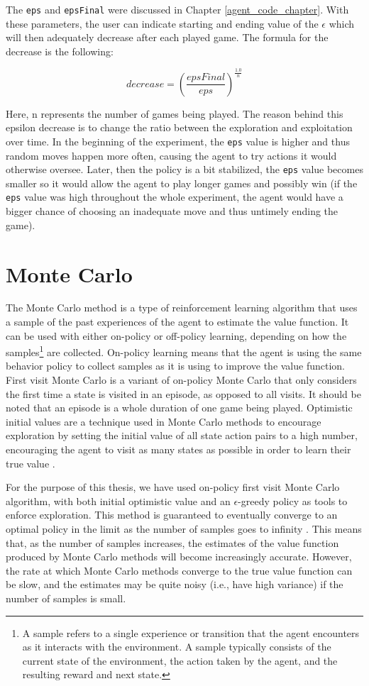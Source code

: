 The \texttt{eps} and \texttt{epsFinal} were discussed in Chapter \ref{agent_code_chapter}. With these parameters, the user can indicate starting and ending value of the $\epsilon$ which will then adequately decrease after each played game. The formula for the decrease is the following:

$$decrease = (\frac{epsFinal}{eps})^{\frac{1.0}{n}}$$

Here, n represents the number of games being played. The reason behind this epsilon decrease is to change the ratio between the exploration and exploitation over time. In the beginning of the experiment, the \texttt{eps} value is higher and thus random moves happen more often, causing the agent to try actions it would otherwise oversee. Later, then the policy is a bit stabilized, the \texttt{eps} value becomes smaller so it would allow the agent to play longer games and possibly win (if the \texttt{eps} value was high throughout the whole experiment, the agent would have a bigger chance of choosing an inadequate move and thus untimely ending the game).

\section{Monte Carlo}
The Monte Carlo method is a type of reinforcement learning algorithm that uses a sample of the past experiences of the agent to estimate the value function. It can be used with either on-policy or off-policy learning, depending on how the samples\footnote{A sample refers to a single experience or transition that the agent encounters as it interacts with the environment. A sample typically consists of the current state of the environment, the action taken by the agent, and the resulting reward and next state.} are collected. On-policy learning means that the agent is using the same behavior policy to collect samples as it is using to improve the value function. First visit Monte Carlo is a variant of on-policy Monte Carlo that only considers the first time a state is visited in an episode, as opposed to all visits. It should be noted that an episode is a whole duration of one game being played. Optimistic initial values are a technique used in Monte Carlo methods to encourage exploration by setting the initial value of all state action pairs to a high number, encouraging the agent to visit as many states as possible in order to learn their true value \citep{RLSuttonBarto}. 

For the purpose of this thesis, we have used on-policy first visit Monte Carlo algorithm, with both initial optimistic value and an $\epsilon$-greedy policy as tools to enforce exploration. This method is guaranteed to eventually converge to an optimal policy in the limit as the number of samples goes to infinity \citep{RLSuttonBarto}. This means that, as the number of samples increases, the estimates of the value function produced by Monte Carlo methods will become increasingly accurate. However, the rate at which Monte Carlo methods converge to the true value function can be slow, and the estimates may be quite noisy (i.e., have high variance) if the number of samples is small.

